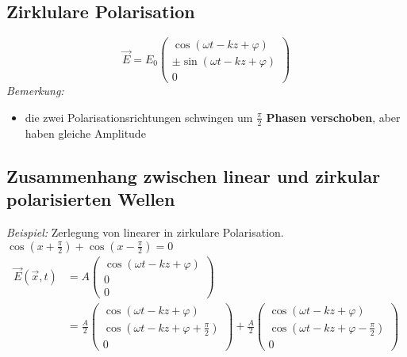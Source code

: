 \subsection{Zirklulare Polarisation}

\begin{equation*}
\vec{E} = E_0 \begin{pmatrix}
\cos \left(\omega t - kz + \varphi \right) \\ \pm\sin\left(\omega t - k z + \varphi\right) \\ 0
\end{pmatrix}
\end{equation*}
\emph{Bemerkung:}
\begin{itemize}
	\item die zwei Polarisationsrichtungen schwingen um $ \frac{\pi}{2} $ \textbf{Phasen verschoben}, aber haben gleiche Amplitude
\end{itemize}

\subsection{Zusammenhang zwischen linear und zirkular polarisierten Wellen}

\noindent
\emph{Beispiel:} Zerlegung von linearer in zirkulare Polarisation.
$ \cos\left( x + \frac{\pi}{2}\right) + \cos\left( x - \frac{\pi}{2}\right) = 0 $
\begin{align*}
\vec{E}(\vec{x},t) &= A \begin{pmatrix}
\cos\left(\omega t - k z + \varphi\right) \\ 0 \\ 0
\end{pmatrix} \\
&= \frac{A}{2} \begin{pmatrix}
\cos\left(\omega t - k z + \varphi \right) \\ \cos\left(\omega t - k z + \varphi + \frac{\pi}{2}\right) \\ 0
\end{pmatrix} + \frac{A}{2} \begin{pmatrix}
\cos \left(\omega t - k z + \varphi\right) \\ \cos \left(\omega t -  k z + \varphi - \frac{\pi}{2}\right) \\ 0
\end{pmatrix}
\end{align*}

